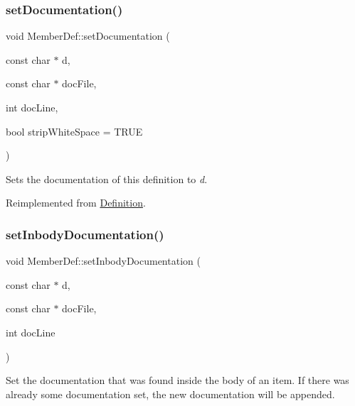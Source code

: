 \mbox{\label{class_member_def_a357486962b5d04cf93dbb52a7a2f2bf6}} 
\subsubsection{\texorpdfstring{setDocumentation()}{setDocumentation()}}
{\footnotesize\ttfamily void Member\+Def\+::set\+Documentation (\begin{DoxyParamCaption}\item[{const char $\ast$}]{d,  }\item[{const char $\ast$}]{doc\+File,  }\item[{int}]{doc\+Line,  }\item[{bool}]{strip\+White\+Space = {\ttfamily TRUE} }\end{DoxyParamCaption})\hspace{0.3cm}{\ttfamily [virtual]}}

Sets the documentation of this definition to {\itshape d}. 

Reimplemented from \mbox{\hyperlink{class_definition_af13e2148f395d2704535e52f50ccc418}{Definition}}.

\mbox{\label{class_member_def_a6c64c400180a47b04ad9a1d18a535184}} 
\subsubsection{\texorpdfstring{setInbodyDocumentation()}{setInbodyDocumentation()}}
{\footnotesize\ttfamily void Member\+Def\+::set\+Inbody\+Documentation (\begin{DoxyParamCaption}\item[{const char $\ast$}]{d,  }\item[{const char $\ast$}]{doc\+File,  }\item[{int}]{doc\+Line }\end{DoxyParamCaption})\hspace{0.3cm}{\ttfamily [virtual]}}

Set the documentation that was found inside the body of an item. If there was already some documentation set, the new documentation will be appended. 

